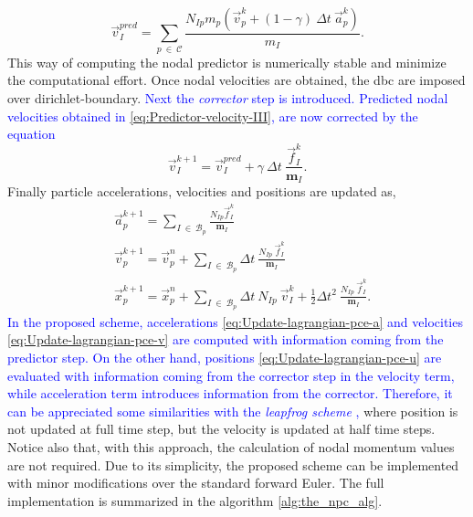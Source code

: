\documentclass[preprint,12pt,a4paper]{elsarticle}
\newcommand{\tens}[1]{
  \ensuremath{\mathbf{{#1}}}
}
\begin{document}
{\color{red}
\begin{equation}
  \label{eq:Predictor-velocity-III}
  \vec{v}_{I}^{pred} =  \sum_{p\ \in\ \mathcal{C}} \frac{ N_{Ip} m_p (\vec{v}_p^k + (1 - \gamma)\ \Delta t\ \vec{a}_p^k)}{m_I}.
\end{equation}
}
This way of computing the nodal predictor is numerically stable
and minimize the computational effort. Once nodal velocities are
obtained, the \acrshort{dbc} are imposed over \gls{dirichlet-boundary}. \textcolor{blue}{Next the \textit{corrector}  step is introduced. Predicted nodal velocities obtained in \eqref{eq:Predictor-velocity-III}, are now corrected by the equation}
\begin{equation}
  \label{eq:Corrector-velocity}
  \vec{v}_{I}^{k+1} = \vec{v}_{I}^{pred} + \gamma\ \Delta t\ \frac{\vec{f}_{I}^{k}}{\tens{m}_I}.
\end{equation}
Finally particle accelerations, velocities and positions are updated as,
\begin{align}
      \label{eq:Update-lagrangian-pce-a}    
        &\vec{a}_p^{k+1} = \sum_{I\ \in\ \mathcal{B}_p} \frac{N_{Ip}\vec{f}_{I}^{k}}{\tens{m}_I}\\
        \label{eq:Update-lagrangian-pce-v}  
      &\vec{v}_p^{k+1} = \vec{v}_p^n + \sum_{I\ \in\ \mathcal{B}_p} \Delta t\
        \frac{N_{Ip}\
        \vec{f}_{I}^{k}}{\tens{m}_I}\\
        \label{eq:Update-lagrangian-pce-u}
      &\vec{x}_p^{k+1} = \vec{x}_p^n + \sum_{I\ \in\ \mathcal{B}_p} \Delta t\
         N_{Ip}\ \vec{v}_{I}^{k} +
        \frac{1}{2}\Delta t^2\ \frac{N_{Ip}\
        \vec{f}_{I}^{k}}{\tens{m}_I}.
\end{align}
\textcolor{blue}{In the proposed scheme, accelerations \eqref{eq:Update-lagrangian-pce-a} and velocities \eqref{eq:Update-lagrangian-pce-v} are computed with information coming from the predictor step. On the other hand, positions \eqref{eq:Update-lagrangian-pce-u} are evaluated with information coming from the corrector step in the velocity term, while acceleration term introduces information from the corrector. Therefore, it can be appreciated some similarities with the \textit{leapfrog scheme} \cite{Zhang_book_2016},} where position is not updated at full time step, but the velocity is updated at half time steps. Notice also that, with this approach, the calculation of nodal momentum values are not required. Due to its simplicity, the proposed scheme can be implemented with minor modifications over the standard forward Euler. The full implementation is summarized in the algorithm \ref{alg:the_npc_alg}.
\end{document}
